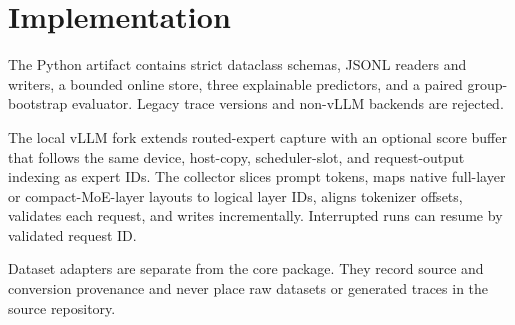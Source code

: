 \section{Implementation}

The Python artifact contains strict dataclass schemas, JSONL readers and
writers, a bounded online \RouteSig store, three explainable predictors, and a
paired group-bootstrap evaluator. Legacy trace versions and non-vLLM backends
are rejected.

The local vLLM fork extends routed-expert capture with an optional score buffer
that follows the same device, host-copy, scheduler-slot, and request-output
indexing as expert IDs. The collector slices prompt tokens, maps native
full-layer or compact-MoE-layer layouts to logical layer IDs, aligns tokenizer
offsets, validates each request, and writes incrementally. Interrupted runs can
resume by validated request ID.

Dataset adapters are separate from the core package. They record source and
conversion provenance and never place raw datasets or generated traces in the
source repository.
